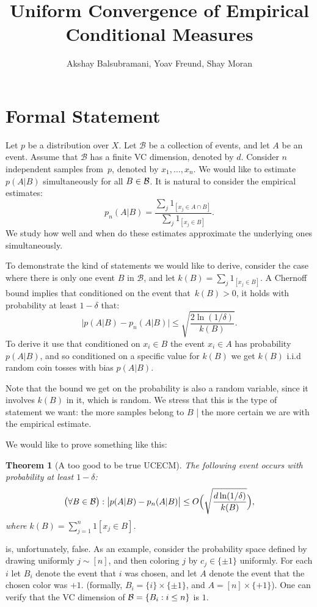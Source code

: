 \documentclass{article}
\title{Uniform Convergence of Empirical Conditional Measures}
\author{Akshay Balsubramani, Yoav Freund, Shay Moran}
\newtheorem{theorem}{Theorem}[section]
\newcommand{\B}{{\cal B}}
\newcommand{\cB}{\mathcal{B}}
\begin{document}
\maketitle

\section{Formal Statement}

Let $p$ be a distribution over $X$.
Let $\cB$ be a collection of events, and let $A$ be an event.
Assume that $\cB$ has a finite VC dimension, denoted by $d$.
Consider $n$ independent samples from~$p$, denoted by $x_1,\ldots,x_n$.
We would like to estimate $p(A \vert B)$ simultaneously for all $B\in \B$.
It is natural to consider the empirical estimates:
\[p_n(A\vert B)=\frac{\sum_j 1_{[x_j\in A \cap B]}}{\sum_j 1_{[x_j\in B]}}.\]
We study how well and when do these estimates approximate the underlying ones simultaneously.

To demonstrate the kind of statements we would like to derive,
consider the case where there is only one event $B$ in $\cB$, 
and let $k(B)=\sum_j 1_{[x_j\in B]}$.
A Chernoff bound implies that conditioned on the event that~$k(B)>0$, 
it holds with probability at least $1-\delta$ that:
\[\bigl\lvert p(A\vert B) - p_n(A \vert B) \bigr\rvert \leq \sqrt{\frac{2\ln(1/\delta)}{k(B)}}.\]
To derive it use that conditioned on $x_i\in B$ the event $x_i\in A$ has probability $p(A\vert B)$, 
and so conditioned on a specific value for $k(B)$ we get $k(B)$ i.i.d random coin tosses with bias $p(A\vert B)$.

Note that the bound we get on the probability is also a random variable, 
since it involves $k(B)$ in it, which is random.
We stress that this is the type of statement we want:
the more samples belong to $B$ | the more certain we are with the empirical estimate.

We would like to prove something like this:
\begin{theorem}[A too good to be true UCECM]\label{thm:toogood}
The following event occurs with probability at least $1-\delta$:
\[\bigl(\forall B\in\B\bigr):\bigl\lvert p(A \vert B) - p_n(A \vert B) \bigr\rvert \leq O\Bigl(\sqrt{\frac{d\ln(1/\delta)}{k(B)}}\Bigr),\]
where $k(B) = \sum_{j=1}^n 1[x_j\in B]$.
\end{theorem}
 is, unfortunately, false. 
As an example, consider the probability space defined by drawing uniformly $j\sim[n]$,
and then coloring $j$ by $c_j\in\{\pm 1\}$ uniformly.
For each $i$ let $B_i$ denote the event that $i$ was chosen,
and let $A$ denote the event that the chosen color was  $+1$.
(formally, $B_i = \{i\}\times\{\pm 1\}$, and $A=[n]\times\{+1\}$).
One can verify that the VC dimension of $\B=\{B_i : i\leq n\}$ is $1$.
\end{document}
